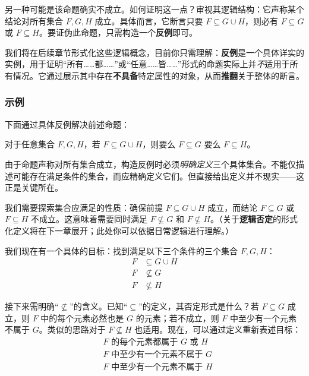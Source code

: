 另一种可能是该命题确实不成立。如何证明这一点？审视其逻辑结构：它声称某个结论对所有集合 $F,G,H$ 成立。具体而言，它断言只要 $F \subseteq G \cup H$，则必有 $F \subseteq G$ 或 $F \subseteq H$。要证伪此命题，只需构造一个\textbf{反例}即可。

我们将在后续章节形式化这些逻辑概念，目前你只需理解：\textbf{反例}是一个具体详实的实例，用于证明``所有……都……''或``任意……皆……''形式的命题实际上并\emph{不}适用于所有情况。它通过展示其中存在\textbf{不具备}特定属性的对象，从而\textbf{推翻}关于整体的断言。

\subsubsection*{示例}

下面通过具体反例解决前述命题：

\begin{center}
    对于任意集合 $F, G, H$，若 $F \subseteq G \cup H$，则要么 $F \subseteq G$ 要么 $F \subseteq H$。
\end{center}

由于命题声称对所有集合成立，构造反例时必须\emph{明确定义}三个具体集合。不能仅描述可能存在满足条件的集合，而应精确定义它们。但直接给出定义并不现实——这正是关键所在。

我们需要探索集合应满足的性质：确保前提 $F \subseteq G \cup H$ 成立，而结论 $F \subseteq G$ 或 $F \subseteq H$ 不成立。这意味着需要同时满足 $F \nsubseteq G$ 和 $F \nsubseteq H$。（关于\textbf{逻辑否定}的形式化定义将在下一章展开；此处你可以依据日常逻辑进行理解。）

我们现在有一个具体的目标：找到满足以下三个条件的三个集合 $F,G,H$：
\begin{align*}
    F &\subseteq G \cup H \\
    F &\nsubseteq G \\
    F &\nsubseteq H
\end{align*}

接下来需明确``$\nsubseteq$''的含义。已知``$\subseteq$''的定义，其否定形式是什么？若 $F \subseteq G$ 成立，则 $F$ 中的每个元素必然也是 $G$ 的元素；若不成立，则 $F$ 中至少有一个元素不属于 $G$。类似的思路对于 $F \nsubseteq H$ 也适用。现在，可以通过定义重新表述目标：
\begin{align*}
    &F \text{\ 的每个元素都属于 } G \text{\ 或\ } H \\
    &F \text{\ 中至少有一个元素不属于\ } G  \\
    &F \text{\ 中至少有一个元素不属于\ } H
\end{align*}

